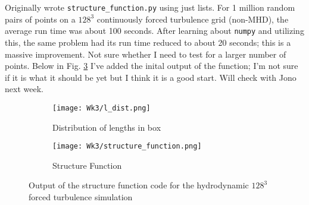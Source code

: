 \documentclass[12pt,letterpaper]{article}
\begin{document}
  Originally wrote \verb|structure_function.py| using just lists. For 1 million random pairs of points on a $128^3$ continuously forced turbulence grid (non-MHD), the average run time was about 100 seconds. After learning about \verb|numpy| and utilizing this, the same problem had its run time reduced to about 20 seconds; this is a massive improvement. Not sure whether I need to test for a larger number of points. Below in Fig. \ref{fig:structure_plots} I've added the inital output of the function; I'm not sure if it is what it should be yet but I think it is a good start. Will check with Jono next week.

  \begin{figure}[!h]
   \centering
  \begin{subfigure}{.4\linewidth}
    \centering
  \texttt{[image: Wk3/l\_dist.png]}
  \caption{Distribution of lengths in box}
  \label{fig:l_dist}
  \end{subfigure}
  \begin{subfigure}{.4\linewidth}
    \centering
  \texttt{[image: Wk3/structure\_function.png]}
  \caption{Structure Function}
  \label{fig:struct_func}
  \end{subfigure}

  \caption{Output of the structure function code for the hydrodynamic $128^3$ forced turbulence simulation}
  \label{fig:structure_plots}
  \end{figure}
\end{document}
